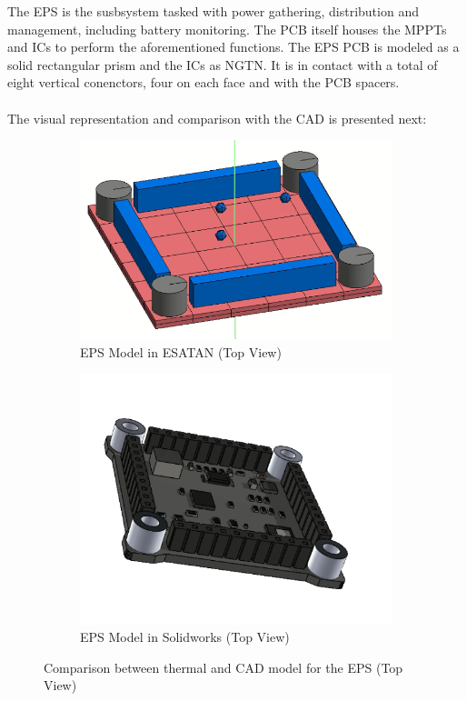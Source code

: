 The EPS is the susbsystem tasked with power gathering, distribution and management, including battery monitoring.
The PCB itself houses the MPPTs and ICs to perform the aforementioned functions. The EPS PCB is modeled as a solid rectangular
prism and the ICs as NGTN. It is in contact with a total of eight vertical conenctors, four on each face
and with the PCB spacers.

\paragraph{}

The visual representation and comparison with the CAD is presented next: 

\begin{figure}[H]
  \centering
  \begin{subfigure}{.5\textwidth}
    \centering
    \includegraphics[width=.6\linewidth]{res/img/5_simulationanalisys/Comparisons/ESATAN/EPS.PNG}
    \caption{EPS Model in ESATAN (Top View)}
    \label{fig:eps}
  \end{subfigure}%
  \begin{subfigure}{.5\textwidth}
    \centering
    \includegraphics[width=.5\linewidth]{res/img/5_simulationanalisys/Comparisons/SLDW/EPS_Solid.PNG}
    \caption{EPS Model in Solidworks (Top View)}
    \label{fig:epssolid}
  \end{subfigure}
  \caption{Comparison between thermal and CAD model for the EPS (Top View)}
  \label{fig:epsim}
\end{figure}

